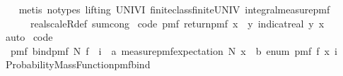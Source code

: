 \begin{isabellebody}
%
\isadelimproof
\ \ %
\endisadelimproof
%
\isatagproof
{}\isamarkupfalse%
\ {\isacharparenleft}{\kern0pt}metis\ {\isacharparenleft}{\kern0pt}no{\isacharunderscore}{\kern0pt}types{\isacharcomma}{\kern0pt}\ lifting{\isacharparenright}{\kern0pt}\ UNIV{\isacharunderscore}{\kern0pt}I\ finite{\isacharunderscore}{\kern0pt}class{\isachardot}{\kern0pt}finite{\isacharunderscore}{\kern0pt}UNIV\ integral{\isacharunderscore}{\kern0pt}measure{\isacharunderscore}{\kern0pt}pmf\ \isanewline
\ \ \ \ \ \ real{\isacharunderscore}{\kern0pt}scaleR{\isacharunderscore}{\kern0pt}def\ sum{\isachardot}{\kern0pt}cong{\isacharparenright}{\kern0pt}%
\endisatagproof
{\isafoldproof}%
%
\isadelimproof
\isanewline
%
\endisadelimproof
\isanewline
{}\isamarkupfalse%
\ {\isacharbrackleft}{\kern0pt}code{\isacharbrackright}{\kern0pt}{\isacharcolon}{\kern0pt}\ {\isachardoublequoteopen}pmf\ {\isacharparenleft}{\kern0pt}return{\isacharunderscore}{\kern0pt}pmf\ x{\isacharparenright}{\kern0pt}\ {\isacharequal}{\kern0pt}\ {\isacharparenleft}{\kern0pt}{\isasymlambda}y{\isachardot}{\kern0pt}\ indicat{\isacharunderscore}{\kern0pt}real\ {\isacharbraceleft}{\kern0pt}y{\isacharbraceright}{\kern0pt}\ x{\isacharparenright}{\kern0pt}\ {\isachardoublequoteclose}\ \isanewline
%
\isadelimproof
\ \ %
\endisadelimproof
%
\isatagproof
{}\isamarkupfalse%
\ auto%
\endisatagproof
{\isafoldproof}%
%
\isadelimproof
\isanewline
%
\endisadelimproof
\isanewline
{}\isamarkupfalse%
\ {\isacharbrackleft}{\kern0pt}code{\isacharbrackright}{\kern0pt}{\isacharcolon}{\kern0pt}\ \isanewline
\ \ {\isachardoublequoteopen}pmf\ {\isacharparenleft}{\kern0pt}bind{\isacharunderscore}{\kern0pt}pmf\ N\ f{\isacharparenright}{\kern0pt}\ {\isacharequal}{\kern0pt}\ {\isacharparenleft}{\kern0pt}{\isasymlambda}i\ {\isacharcolon}{\kern0pt}{\isacharcolon}{\kern0pt}\ {\isacharprime}{\kern0pt}a{\isachardot}{\kern0pt}\ measure{\isacharunderscore}{\kern0pt}pmf{\isachardot}{\kern0pt}expectation\ N\ {\isacharparenleft}{\kern0pt}{\isasymlambda}{\isacharparenleft}{\kern0pt}x\ {\isacharcolon}{\kern0pt}{\isacharcolon}{\kern0pt}\ {\isacharprime}{\kern0pt}b\ {\isacharcolon}{\kern0pt}{\isacharcolon}{\kern0pt}enum{\isacharparenright}{\kern0pt}{\isachardot}{\kern0pt}\ pmf\ {\isacharparenleft}{\kern0pt}f\ x{\isacharparenright}{\kern0pt}\ i{\isacharparenright}{\kern0pt}{\isacharparenright}{\kern0pt}{\isachardoublequoteclose}\ \isanewline
%
\isadelimproof
\ \ %
\endisadelimproof
%
\isatagproof
{}\isamarkupfalse%
\ Probability{\isacharunderscore}{\kern0pt}Mass{\isacharunderscore}{\kern0pt}Function{\isachardot}{\kern0pt}pmf{\isacharunderscore}{\kern0pt}bind\isanewline

\end{isabellebody}
